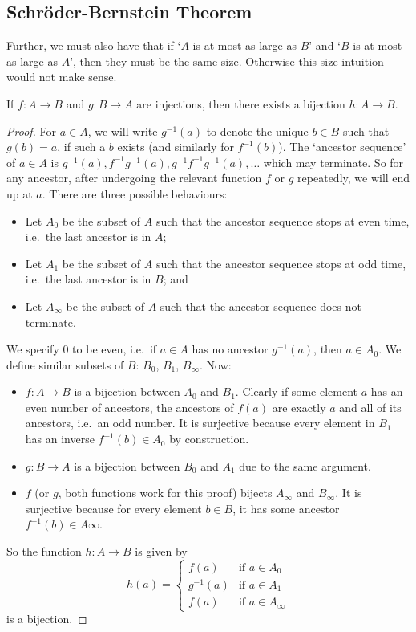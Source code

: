 \subsection{Schr\"oder-Bernstein Theorem}
Further, we must also have that if `\(A\) is at most as large as \(B\)' and `\(B\) is at most as large as \(A\)', then they must be the same size.
Otherwise this size intuition would not make sense.
\begin{theorem}
	If \(f\colon A\to B\) and \(g\colon B\to A\) are injections, then there exists a bijection \(h\colon A\to B\).
\end{theorem}
\begin{proof}
	For \(a\in A\), we will write \(g^{-1}(a)\) to denote the unique \(b \in B\) such that \(g(b) = a\), if such a \(b\) exists (and similarly for \(f^{-1}(b)\)).
	The `ancestor sequence' of \(a \in A\) is \(g^{-1}(a), f^{-1}g^{-1}(a), g^{-1}f^{-1}g^{-1}(a), \dots\) which may terminate.
	So for any ancestor, after undergoing the relevant function \(f\) or \(g\) repeatedly, we will end up at \(a\).
	There are three possible behaviours:
	\begin{itemize}
		\item Let \(A_0\) be the subset of \(A\) such that the ancestor sequence stops at even time, i.e.\ the last ancestor is in \(A\);
		\item Let \(A_1\) be the subset of \(A\) such that the ancestor sequence stops at odd time, i.e.\ the last ancestor is in \(B\); and
		\item Let \(A_\infty\) be the subset of \(A\) such that the ancestor sequence does not terminate.
	\end{itemize}
	We specify 0 to be even, i.e.\ if \(a\in A\) has no ancestor \(g^{-1}(a)\), then \(a \in A_0\).
	We define similar subsets of \(B\): \(B_0\), \(B_1\), \(B_\infty\).
	Now:
	\begin{itemize}
		\item \(f\colon A \to B\) is a bijection between \(A_0\) and \(B_1\).
		      Clearly if some element \(a\) has an even number of ancestors, the ancestors of \(f(a)\) are exactly \(a\) and all of its ancestors, i.e.\ an odd number.
		      It is surjective because every element in \(B_1\) has an inverse \(f^{-1}(b) \in A_0\) by construction.
		\item \(g\colon B \to A\) is a bijection between \(B_0\) and \(A_1\) due to the same argument.
		\item \(f\) (or \(g\), both functions work for this proof) bijects \(A_\infty\) and \(B_\infty\).
		      It is surjective because for every element \(b \in B\), it has some ancestor \(f^{-1}(b) \in A\infty\).
	\end{itemize}
	So the function \(h\colon A \to B\) is given by
	\[
		h(a) = \begin{cases}
			f(a)      & \text{if } a \in A_0      \\
			g^{-1}(a) & \text{if } a \in A_1      \\
			f(a)      & \text{if } a \in A_\infty
		\end{cases}
	\]
	is a bijection.
\end{proof}
